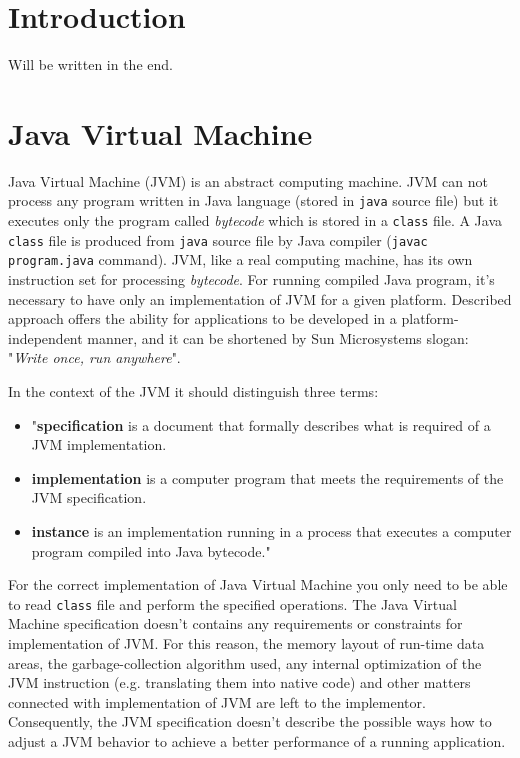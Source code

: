 \documentclass[
  digital, %
  oneside,
  notable, %
  nolof,     %
  nolot     %
]{fithesis3}
\begin{document}
\chapter{Introduction}
    Will be written in the end.

\chapter{Java Virtual Machine}

Java Virtual Machine (JVM) is an abstract computing machine. JVM can not process any program written in Java language (stored in \texttt{java} source file) but it executes only the program called \textit{bytecode} which is stored in a \texttt{class} file. A Java \texttt{class} file is produced from \texttt{java} source file by Java compiler (\texttt{javac program.java} command). JVM, like a real computing machine, has its own instruction set for processing \textit{bytecode}. For running compiled Java program, it's necessary to have only an implementation of JVM for a given platform. Described approach offers the ability for applications to be developed in a platform-independent manner, and it can be shortened by Sun Microsystems slogan: "\textit{Write once, run anywhere}". \cite{spec}

In the context of the JVM it should distinguish three terms:
\begin{itemize}
	\item "\textbf{specification} is a document that formally describes what is required of a JVM implementation.
	\item \textbf{implementation} is a computer program that meets the requirements of the JVM specification.
	\item \textbf{instance} is an implementation running in a process that executes a computer program compiled into Java bytecode." \cite{brief}
\end{itemize}

For the correct implementation of Java Virtual Machine you only need to be able to read \texttt{class} file and perform the specified operations. The Java Virtual Machine specification doesn't contains any requirements or constraints for implementation of JVM. For this reason, the memory layout of run-time data areas, the garbage-collection algorithm used, any internal optimization of the JVM instruction (e.g. translating them into native code) and other matters connected with implementation of JVM are left to the implementor. Consequently, the JVM specification doesn't describe the possible ways how to adjust a JVM behavior to achieve a better performance of a running application. \cite{spec}
\end{document}

